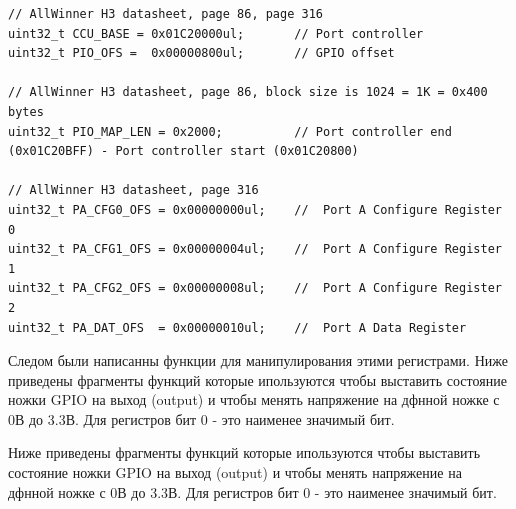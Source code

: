 \begin{small}
\begin{verbatim}
// AllWinner H3 datasheet, page 86, page 316
uint32_t CCU_BASE = 0x01C20000ul;       // Port controller
uint32_t PIO_OFS =  0x00000800ul;       // GPIO offset

// AllWinner H3 datasheet, page 86, block size is 1024 = 1K = 0x400 bytes 
uint32_t PIO_MAP_LEN = 0x2000;          // Port controller end (0x01C20BFF) - Port controller start (0x01C20800)

// AllWinner H3 datasheet, page 316
uint32_t PA_CFG0_OFS = 0x00000000ul;    //  Port A Configure Register 0
uint32_t PA_CFG1_OFS = 0x00000004ul;    //  Port A Configure Register 1
uint32_t PA_CFG2_OFS = 0x00000008ul;    //  Port A Configure Register 2
uint32_t PA_DAT_OFS  = 0x00000010ul;    //  Port A Data Register
\end{verbatim}
\end{small}


Следом были написанны функции для манипулирования этими регистрами. Ниже приведены фрагменты функций которые ипользуются чтобы выставить состояние ножки GPIO на выход (output) и чтобы менять напряжение на дфнной ножке с 0В до 3.3В. Для регистров бит 0 - это наименее значимый бит.


Ниже приведены фрагменты функций которые ипользуются чтобы выставить состояние ножки GPIO на выход (output) и чтобы менять напряжение на дфнной ножке с 0В до 3.3В. Для регистров бит 0 - это наименее значимый бит.

